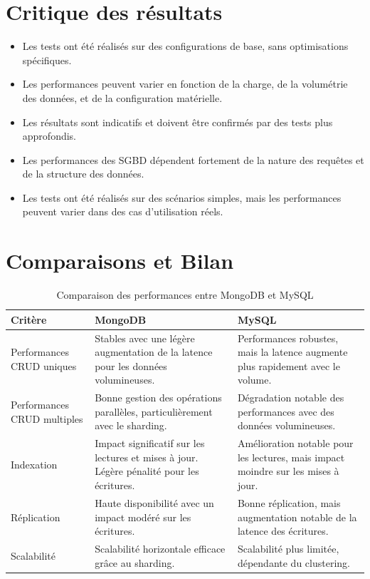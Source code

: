 \documentclass[12pt,a4paper]{report}
\begin{document}
\section{Critique des résultats}

    \begin{card}
        \begin{itemize}
            \item Les tests ont été réalisés sur des configurations de base, sans optimisations spécifiques.
            \item Les performances peuvent varier en fonction de la charge, de la volumétrie des données, et de la configuration matérielle.
            \item Les résultats sont indicatifs et doivent être confirmés par des tests plus approfondis.
            \item Les performances des SGBD dépendent fortement de la nature des requêtes et de la structure des données.
            \item Les tests ont été réalisés sur des scénarios simples, mais les performances peuvent varier dans des cas d'utilisation réels.
        \end{itemize}
    \end{card}

\section{Comparaisons et Bilan}

\begin{table}[h!]
    \centering
    \begin{tabular}{|l|p{7cm}|p{7cm}|}
    \hline
    \textbf{Critère} & \textbf{MongoDB} & \textbf{MySQL} \\ \hline
    Performances CRUD uniques & 
    Stables avec une légère augmentation de la latence pour les données volumineuses. & 
    Performances robustes, mais la latence augmente plus rapidement avec le volume. \\ \hline
    Performances CRUD multiples & 
    Bonne gestion des opérations parallèles, particulièrement avec le sharding. & 
    Dégradation notable des performances avec des données volumineuses. \\ \hline
    Indexation & 
    Impact significatif sur les lectures et mises à jour. Légère pénalité pour les écritures. & 
    Amélioration notable pour les lectures, mais impact moindre sur les mises à jour. \\ \hline
    Réplication & 
    Haute disponibilité avec un impact modéré sur les écritures. & 
    Bonne réplication, mais augmentation notable de la latence des écritures. \\ \hline
    Scalabilité & 
    Scalabilité horizontale efficace grâce au sharding. & 
    Scalabilité plus limitée, dépendante du clustering. \\ \hline
    \end{tabular}
    \caption{Comparaison des performances entre MongoDB et MySQL}
    \label{tab:comparaison_performances}
    \end{table}
    
\end{document}

